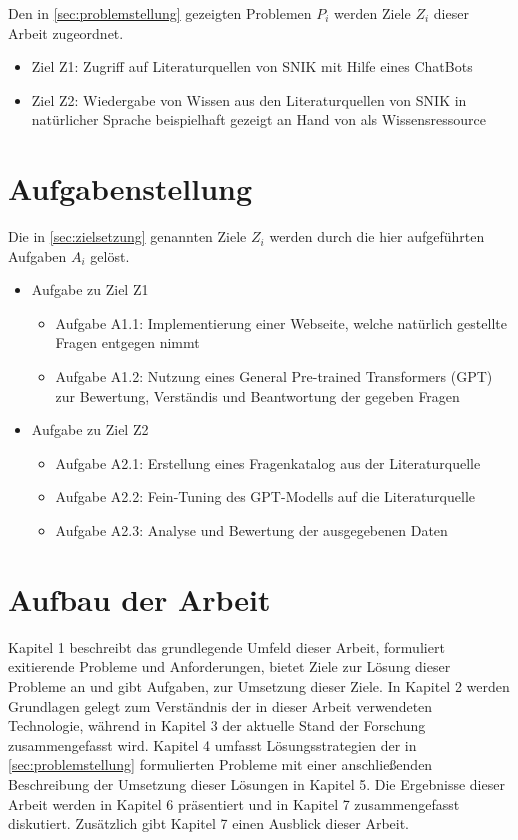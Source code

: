 Den in \ref{sec:problemstellung} gezeigten Problemen $P_i$ werden Ziele $Z_i$ dieser Arbeit zugeordnet.

\begin{itemize}
  \item Ziel Z1: Zugriff auf Literaturquellen von SNIK mit Hilfe eines ChatBots
  \item Ziel Z2: Wiedergabe von Wissen aus den Literaturquellen von SNIK in natürlicher Sprache beispielhaft gezeigt an Hand von \citet{bb} als Wissensressource
\end{itemize}

\section{Aufgabenstellung}

Die in \ref{sec:zielsetzung} genannten Ziele $Z_i$ werden durch die hier aufgeführten Aufgaben $A_i$ gelöst.

\begin{itemize}
  \item Aufgabe zu Ziel Z1
  \begin{itemize}
    \item Aufgabe A1.1: Implementierung einer Webseite, welche natürlich gestellte Fragen entgegen nimmt
    \item Aufgabe A1.2: Nutzung eines General Pre-trained Transformers (GPT) zur Bewertung, Verständis und Beantwortung der gegeben Fragen
  \end{itemize}
  \item Aufgabe zu Ziel Z2
  \begin{itemize}
    \item Aufgabe A2.1: Erstellung eines Fragenkatalog aus der Literaturquelle
    \item Aufgabe A2.2: Fein-Tuning des GPT-Modells auf die Literaturquelle
    \item Aufgabe A2.3: Analyse und Bewertung der ausgegebenen Daten
  \end{itemize}
\end{itemize}

\section{Aufbau der Arbeit}
Kapitel 1 beschreibt das grundlegende Umfeld dieser Arbeit, formuliert exitierende Probleme und Anforderungen, bietet Ziele zur Lösung dieser Probleme an und gibt Aufgaben, zur Umsetzung dieser Ziele. 
In Kapitel 2 werden Grundlagen gelegt zum Verständnis der in dieser Arbeit verwendeten Technologie, während in Kapitel 3 der aktuelle Stand der Forschung zusammengefasst wird. 
Kapitel 4 umfasst Lösungsstrategien der in \ref{sec:problemstellung} formulierten Probleme mit einer anschließenden Beschreibung der Umsetzung dieser Lösungen in Kapitel 5. 
Die Ergebnisse dieser Arbeit werden in Kapitel 6 präsentiert und in Kapitel 7 zusammengefasst diskutiert. Zusätzlich gibt Kapitel 7 einen Ausblick dieser Arbeit.